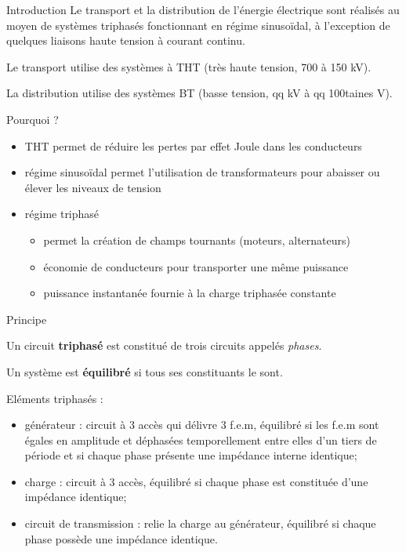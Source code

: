 \begin{frame}{Introduction}
	Le transport et la distribution de l'énergie électrique sont réalisés au moyen
	de systèmes triphasés fonctionnant en régime sinusoïdal, à l'exception
	de quelques liaisons haute tension à courant continu.
	
	\vfill
	Le transport utilise des systèmes à THT (très haute tension, 700 à 150 kV).
	
	\vfill
	La distribution utilise des systèmes BT (basse tension, qq kV à qq
	100taines V).
	
	\vfill
	Pourquoi ?
	\begin{itemize}
		\item THT permet de réduire les pertes par effet Joule dans les conducteurs
		\item régime sinusoïdal permet l'utilisation de transformateurs pour
		abaisser ou élever les niveaux de tension
		\item régime triphasé 
		\begin{itemize}
			\item permet la création de champs tournants (moteurs, alternateurs)
			\item économie de conducteurs pour transporter une même puissance
			\item puissance instantanée fournie à la charge triphasée constante
		\end{itemize}
	\end{itemize}
\end{frame}


\begin{frame}{Principe}
	
	Un circuit \textbf{triphasé} est constitué de trois circuits appelés {\em phases}. 
	
	\vfill
	
	Un système est \textbf{équilibré} si tous ses constituants le sont.
	
	\vfill 
	
	Eléments triphasés : 
	\begin{itemize}
		\item générateur : circuit à 3 accès qui délivre 3 f.e.m, équilibré si
		les f.e.m sont égales en amplitude et déphasées temporellement
		entre elles d'un tiers de période et si chaque phase présente une
		impédance interne identique;
		\item charge : circuit à 3 accès, équilibré si chaque phase est
		constituée d'une impédance identique;
		\item circuit de transmission : relie la charge au générateur,
		équilibré si chaque phase possède une impédance identique.
	\end{itemize}
\end{frame}


